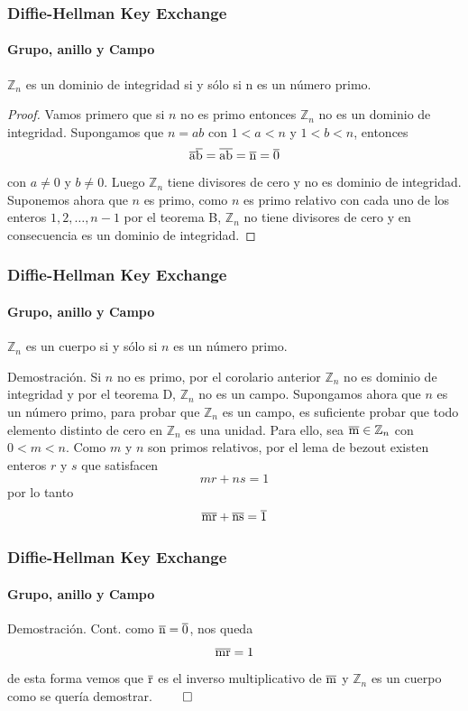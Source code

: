 \documentclass[spanish, mexico]{beamer}
\begin{document}
	\begin{frame}
	    \frametitle{Diffie-Hellman Key Exchange}
		\framesubtitle{Grupo, anillo y Campo}
	    \begin{corollary}
	        $\mathbb{Z}_n$ es un dominio de integridad si y sólo si n es un número primo.
	    \end{corollary}
	    \begin{proof}
	        Vamos primero que si $n$ no es primo entonces $\mathbb{Z}_n$ no es un dominio de integridad. Supongamos que $n=ab$ con $1<a<n$ y $1<b<n$, entonces
	        $$\overline{\rm a} \overline{\rm b} = \overline{\rm ab} = \overline{\rm n} = \overline{\rm 0}$$
	        con $a\neq0$ y $b\neq0$. Luego $\mathbb{Z}_n$ tiene divisores de cero y no es dominio de integridad. Suponemos ahora que $n$ es primo, como $n$ es primo relativo con cada uno de los enteros $1,2,\dots, n-1$ por el teorema B, $\mathbb{Z}_n$ no tiene divisores de cero y en consecuencia es un dominio de integridad.
	    \end{proof}
	\end{frame}
	
	\begin{frame}
	    \frametitle{Diffie-Hellman Key Exchange}
		\framesubtitle{Grupo, anillo y Campo}
	    \begin{theorem}
	        $\mathbb{Z}_n$ es un cuerpo si y sólo si $n$ es un número primo.
	    \end{theorem}
	    \begin{block}{Demostración.}
	        Si $n$ no es primo, por el corolario anterior $\mathbb{Z}_n$ no es dominio de integridad y por el teorema D, $\mathbb{Z}_n$ no es un campo. Supongamos ahora que $n$ es un número primo, para probar que $\mathbb{Z}_n$ es un campo, es suficiente probar que todo elemento distinto de cero en $\mathbb{Z}_n$ es una unidad. Para ello, sea $\overline{\rm m} \in \mathbb{Z}_n$ con $0<m<n$. Como $m$ y $n$ son primos relativos, por el lema de bezout existen enteros $r$ y $s$ que satisfacen
	        $$mr + ns = 1$$
	        por lo tanto
	        $$\overline{\rm m}\overline{\rm r} + \overline{\rm n} \overline{\rm s} = \overline{\rm 1}$$
	    \end{block}
	\end{frame}
	
	\begin{frame}
	    \frametitle{Diffie-Hellman Key Exchange}
		\framesubtitle{Grupo, anillo y Campo}
	    \begin{block}{Demostración. Cont.}
	        como $\overline{\rm n} = \overline{\rm 0}$, nos queda
	        $$\overline{\rm m}\overline{\rm r} = 1$$
	        de esta forma vemos que $\overline{\rm r}$ es el inverso multiplicativo de $\overline{\rm m}$ y $\mathbb{Z}_n$ es un cuerpo como se quería demostrar. $\qed$
	    \end{block}
	\end{frame}
	
\end{document}
